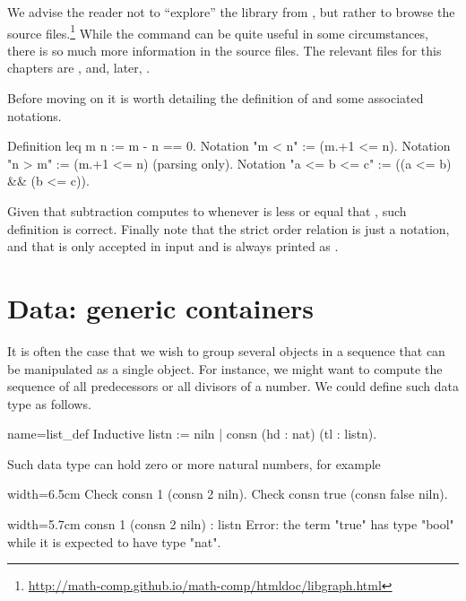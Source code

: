 We advise the reader not to ``explore'' the library from \Coq{}, but
rather to browse the source files.\footnote{\url{http://math-comp.github.io/math-comp/htmldoc/libgraph.html}}
While the 
command can be quite useful in some circumstances, there is so much more
information in the source files.  
The relevant files for this chapters are , 
and, later, .


Before moving on it is worth detailing the definition of 
and some associated notations.

\begin{coq}{}{}
Definition leq m n := m - n == 0.
Notation "m < n"  := (m.+1 <= n).
Notation "n > m"  := (m.+1 <= n) (parsing only).
Notation "a <= b <= c" := ((a <= b) && (b <= c)).
\end{coq}
Given that subtraction computes to  whenever  is less or equal
that , such definition is correct.  Finally note that the strict order
relation is just a notation, and that  is only accepted in input
and is always printed as  .



\section{Data: generic containers}\label{sec:poly}

It is often the case that we wish to group several objects in a
sequence that can be manipulated as a single object.  For instance, we
might want to compute the sequence of all predecessors or all divisors
of a number.  We could define such data type as follows.

\begin{coq}{name=list_def}{}
Inductive listn := niln | consn (hd : nat) (tl : listn).
\end{coq}

Such data type can hold zero or more natural numbers, for example

\begin{coq}{}{width=6.5cm}
Check consn 1 (consn 2 niln).
Check consn true (consn false niln).
$~$
$~$
\end{coq}{}{}
\begin{coqout}{}{width=5.7cm}
consn 1 (consn 2 niln) : listn
Error: the term "true" has
type "bool" while it is
expected to have type "nat".
\end{coqout}{}{}

